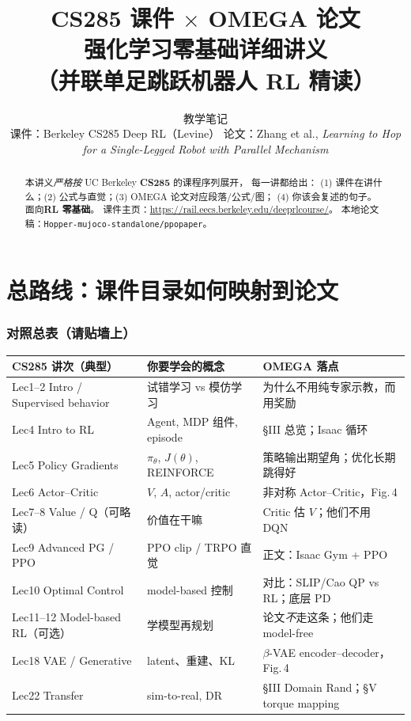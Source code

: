 \documentclass[11pt,a4paper]{article}
\title{\textbf{CS285 课件 $\times$ OMEGA 论文}\\[0.35em]
\large 强化学习零基础详细讲义\\[0.2em]
\normalsize （并联单足跳跃机器人 RL 精读）}
\author{教学笔记\\
\small 课件：Berkeley CS285 Deep RL（Levine）\quad
论文：Zhang et al., \textit{Learning to Hop for a Single-Legged Robot
with Parallel Mechanism}}
\date{}
\begin{document}
\maketitle

\begin{abstract}
\noindent
本讲义\emph{严格按} UC Berkeley \textbf{CS285} 的课程序列展开，
每一讲都给出：
(1) 课件在讲什么；(2) 公式与直觉；(3) OMEGA 论文对应段落/公式/图；
(4) 你该会复述的句子。面向\textbf{RL 零基础}。
课件主页：\url{https://rail.eecs.berkeley.edu/deeprlcourse/}。
本地论文稿：\texttt{Hopper-mujoco-standalone/ppopaper}。
\end{abstract}

\tableofcontents
\newpage

\part{总路线：课件目录如何映射到论文}

\section{对照总表（请贴墙上）}

\begin{center}
\small
\begin{tabular}{@{}p{3.6cm}p{5.0cm}p{5.0cm}@{}}
\hline
\textbf{CS285 讲次（典型）} & \textbf{你要学会的概念} & \textbf{OMEGA 落点} \\
\hline
Lec1--2 Intro / Supervised behavior
& 试错学习 vs 模仿学习 & 为什么不用纯专家示教，而用奖励 \\
\hline
Lec4 Intro to RL
& Agent, MDP 组件, episode & §III 总览；Isaac 循环 \\
\hline
Lec5 Policy Gradients
& $\pi_\theta$, $J(\theta)$, REINFORCE & 策略输出期望角；优化长期跳得好 \\
\hline
Lec6 Actor--Critic
& $V$, $A$, actor/critic & 非对称 Actor--Critic，Fig.\,4 \\
\hline
Lec7--8 Value / Q（可略读）
& 价值在干嘛 & Critic 估 $V$；他们不用 DQN \\
\hline
Lec9 Advanced PG / PPO
& PPO clip / TRPO 直觉 & 正文：Isaac Gym + PPO \\
\hline
Lec10 Optimal Control
& model-based 控制 & 对比：SLIP/Cao QP vs RL；底层 PD \\
\hline
Lec11--12 Model-based RL（可选）
& 学模型再规划 & 论文\emph{不}走这条；他们走 model-free \\
\hline
Lec18 VAE / Generative
& latent、重建、KL & $\beta$-VAE encoder--decoder，Fig.\,4 \\
\hline
Lec22 Transfer
& sim-to-real, DR & §III Domain Rand；§V torque mapping \\
\hline
\end{tabular}
\end{center}
\end{document}
